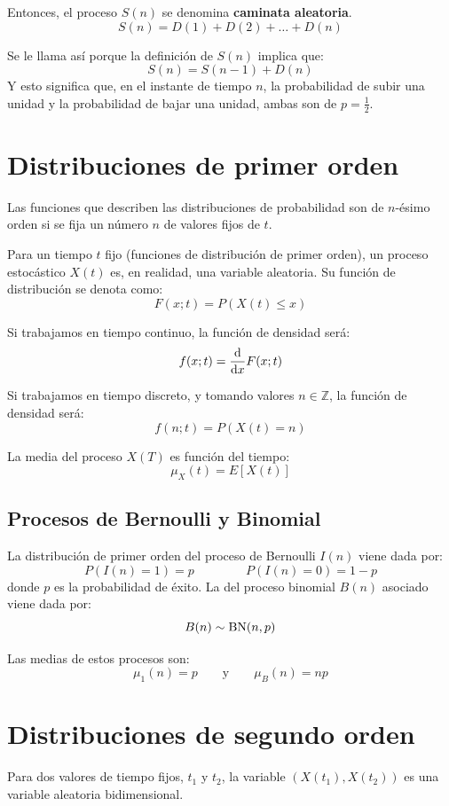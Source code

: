 \documentclass[a4paper]{book}
\begin{document}
Entonces, el proceso $S(n)$ se denomina \textbf{caminata aleatoria}.
\[ S(n) = D(1)+D(2)+\dots +D(n) \]

Se le llama así porque la definición de $S(n)$ implica que:
\[ S(n) = S(n-1) + D(n) \]
Y esto significa que, en el instante de tiempo $n$, la probabilidad de subir una unidad y la probabilidad de bajar una unidad, ambas son de $p=\frac{1}{2}$.

\section{Distribuciones de primer orden}

Las funciones que describen las distribuciones de probabilidad son de $n$-ésimo orden si se fija un número $n$ de valores fijos de $t$.

Para un tiempo $t$ fijo (funciones de distribución de primer orden), un proceso estocástico $X(t)$ es, en realidad, una variable aleatoria. Su función de distribución se denota como:
\[ F \left( x;t \right) = P \left( X(t) \leq x \right) \]

Si trabajamos en tiempo continuo, la función de densidad será:
\[ f(x;t) = \dv{}{x} F(x;t) \]

Si trabajamos en tiempo discreto, y tomando valores $n\in \mathbb{Z}$, la función de densidad será:
\[ f \left( n;t \right) = P \left( X(t) = n \right) \]

La media del proceso $X(T)$ es función del tiempo:
\[ \mu _X (t) = E \left[ X(t) \right] \]

\subsection{Procesos de Bernoulli y Binomial}

La distribución de primer orden del proceso de Bernoulli $I(n)$ viene dada por:
\[ P \left( I(n) = 1 \right) = p \, \qquad \qquad P \left( I(n) = 0 \right) = 1-p \]
donde $p$ es la probabilidad de éxito. La del proceso binomial $B(n)$ asociado viene dada por:
\[ B(n)\sim \operatorname{BN} (n,p) \]

Las medias de estos procesos son:
\[ \mu _1 (n) = p \qquad \text{y} \qquad  \mu _B (n) = np\]

\section{Distribuciones de segundo orden}

Para dos valores de tiempo fijos, $t_1$ y $t_2$, la variable $\left( X(t_1), X(t_2) \right)$ es una variable aleatoria bidimensional.
\end{document}
